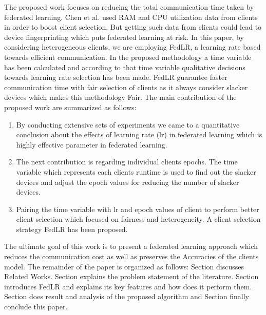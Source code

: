 \documentclass[conference]{IEEEtran}
\newcommand{\RNum}[1]{\uppercase\expandafter{\romannumeral #1\relax}}
\begin{document}
 The proposed work focuses on reducing the total communication time taken by federated learning. Chen et al. \cite{chen2023boosting} used RAM and CPU utilization data from clients in order to boost client selection. But getting such data from clients could lead to device fingerprinting \cite{radhakrishnan2014gtid} \cite{patwari2022dnn} which puts federated learning at risk.  In this paper, by considering heterogeneous clients, we are employing FedLR, a learning rate based towards efficient communication. In the proposed methodology a time variable has been calculated and according to that time variable qualitative decisions towards learning rate selection has been made.
FedLR guarantee faster communication time with fair selection of clients as it always consider slacker devices which makes this methodology Fair. The main contribution of the proposed work are summarized as follows:
\begin{enumerate}
	\item By conducting extensive sets of experiments we came to a quantitative conclusion about the effects of learning rate (lr) in federated learning which is highly effective parameter in federated learning.
	\item The next contribution is regarding individual clients epochs. The time variable which represents each clients runtime is used to find out the slacker devices and adjust the epoch values for reducing the number of slacker devices.
	\item Pairing the time variable with lr and epoch values of client to perform better client selection which focused on fairness and heterogeneity. A client selection strategy FedLR has been proposed.
\end{enumerate}

The ultimate goal of this work is to present a federated learning approach which reduces the communication cost as well as preserves the Accuracies of the clients model. The remainder of the paper is organized as follows: Section \RNum{2} discusses Related Works. Section \RNum{3} explains the problem statement of the literature. Section \RNum{4} introduces FedLR and explains its key features and how does it perform them. Section \RNum{5} does result and analysis of the proposed algorithm and Section \RNum{6} finally conclude this paper.
\end{document}
